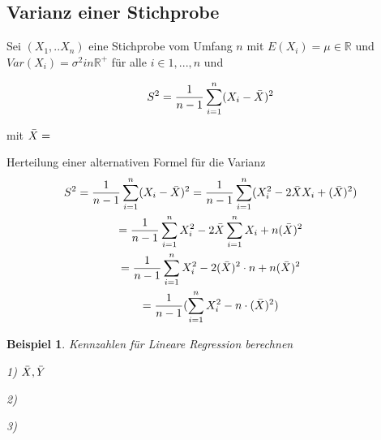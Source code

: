 \documentclass{tufte-handout}
\theoremstyle{own}
\newtheorem{example}{Beispiel}[]
\begin{document}
\subsection{Varianz einer Stichprobe}

Sei $(X_1,..X_n)$ eine Stichprobe vom Umfang $n$ mit $E(X_i) = \mu \in \mathbb{R}$
und $Var(X_i) = \sigma^2 in \mathbb{R}^{+}$ für alle $i \in 1,...,n$ und

\begin{equation}
	S^2 = \frac{1}{n-1} \sum_{i=1}^n (X_i - \Bar{X})^2
\end{equation}

mit $\Bar{X} = $


Herteilung einer alternativen Formel für die Varianz
\begin{gather}
S^2 = \frac{1}{n-1} \sum_{i=1}^n (X_i - \Bar{X})^2
= \frac{1}{n-1} \sum_{i=1}^n (X_i^2 - 2\Bar{X}X_i + (\Bar{X})^2 ) \\
= \frac{1}{n-1} \sum_{i=1}^n X_i^2 - 2\Bar{X} \sum_{i=1}^n X_i + n (\Bar{X})^2 \\
= \frac{1}{n-1} \sum_{i=1}^n X_i^2 - 2 (\Bar{X})^2 \cdot n + n (\Bar{X})^2 \\
= \frac{1}{n-1} (\sum_{i=1}^n X_i^2 - n \cdot (\Bar{X})^2 )
\end{gather}

\begin{example} Kennzahlen für Lineare Regression berechnen

1) $\Bar{X}, \Bar{Y}$

2)

3)

\end{example}



\end{document}

